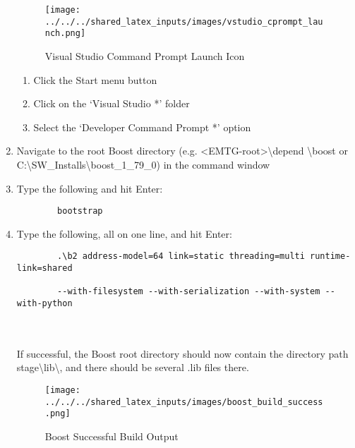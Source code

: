 \begin{enumerate}
		\begin{figure}[H]
			\centering
			\texttt{[image: ../../../shared\_latex\_inputs/images/vstudio\_cprompt\_launch.png]}
			\caption{Visual Studio Command Prompt Launch Icon}
		\end{figure}
	\begin{enumerate}
		\item Click the Start menu button
		\item Click on the `Visual Studio *' folder 
		\item Select the `Developer Command Prompt *' option
	\end{enumerate}
	\item Navigate to the root Boost directory (e.g. \textless EMTG-root\textgreater \textbackslash depend \textbackslash boost or C:\textbackslash SW\_Installs\textbackslash boost\_1\_79\_0) in the command window
	\item Type the following and hit Enter:
	\begin{verbatim}
		bootstrap
	\end{verbatim}	
	\item Type the following, all on one line, and hit Enter:
	\begin{verbatim}
		.\b2 address-model=64 link=static threading=multi runtime-link=shared 
		
		--with-filesystem --with-serialization --with-system --with-python
	\end{verbatim} \\ \\
	If successful, the Boost root directory should now contain the directory path stage\textbackslash lib\textbackslash, and there should be several .lib files there. 
	\begin{figure}[H]
		\centering
		\texttt{[image: ../../../shared\_latex\_inputs/images/boost\_build\_success.png]}
		\caption{Boost Successful Build Output}
	\end{figure}
\end{enumerate}
